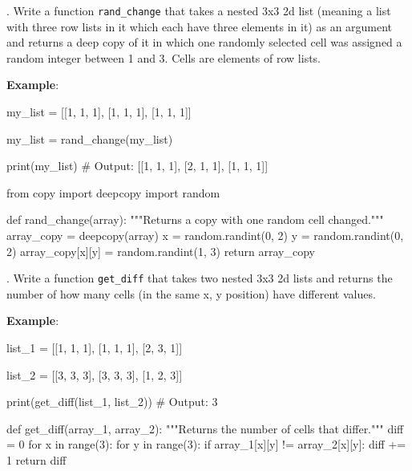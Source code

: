 . Write a function \texttt{rand\_change} that takes a nested 3x3 2d list (meaning a list with three row lists in it which each have three elements in it) as an argument and returns a deep copy of it in which one randomly selected cell was assigned a random integer between 1 and 3. Cells are elements of row lists.

\vspace{1em}

\noindent \textbf{Example}:

\begin{pythoncode}

my_list = [[1, 1, 1], [1, 1, 1], [1, 1, 1]]

my_list = rand_change(my_list)

print(my_list)
# Output: [[1, 1, 1], [2, 1, 1], [1, 1, 1]]

\end{pythoncode}

\begin{solution}

\begin{pythoncode}

from copy import deepcopy
import random

def rand_change(array):
    """Returns a copy with one random cell changed."""
    array_copy = deepcopy(array)
    x = random.randint(0, 2)
    y = random.randint(0, 2)
    array_copy[x][y] = random.randint(1, 3)
    return array_copy

\end{pythoncode}

\end{solution}

. Write a function \texttt{get\_diff} that takes two nested 3x3 2d lists and returns the number of how many cells (in the same x, y position) have different values.

\vspace{1em}

\noindent \textbf{Example}:

\begin{pythoncode}

list_1 = [[1, 1, 1], [1, 1, 1], [2, 3, 1]]

list_2 = [[3, 3, 3], [3, 3, 3], [1, 2, 3]]

print(get_diff(list_1, list_2))
# Output: 3

\end{pythoncode}

\begin{solution}

\begin{pythoncode}

def get_diff(array_1, array_2):
    """Returns the number of cells that differ."""
    diff = 0
    for x in range(3):
        for y in range(3):
            if array_1[x][y] != array_2[x][y]:
                diff += 1
    return diff

\end{pythoncode}

\end{solution}

